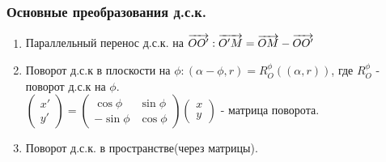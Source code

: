 \documentclass[12pt]{article}
\begin{document}
\subsubsection{Основные преобразования д.с.к.}
\begin{enumerate}
    \item Параллельный перенос д.с.к. на $\overrightarrow{OO'}: \overrightarrow{O'M} = \overrightarrow{OM}-\overrightarrow{OO'}$
    \item Поворот д.с.к в плоскости на $\phi: (\alpha-\phi, r) = R_O^\phi((\alpha, r))$, где $R_O^\phi$ -  поворот д.с.к на $\phi$.\\
    $\begin{pmatrix}
         x'\\
         y'
    \end{pmatrix} = \begin{pmatrix}
         \cos\phi & \sin\phi \\
         -\sin\phi & \cos\phi
    \end{pmatrix}
    \begin{pmatrix}
         x\\
         y
    \end{pmatrix}$ - матрица поворота.
    \item Поворот д.с.к. в пространстве(через матрицы).
\end{enumerate}
\end{document}
